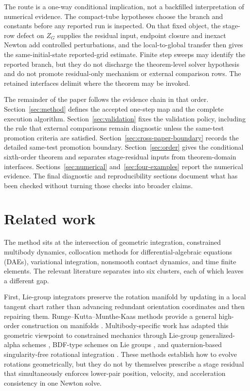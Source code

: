 \documentclass[preprint,12pt]{elsarticle}
\begin{document}
\noindent
The route is a one-way conditional implication, not a backfilled
interpretation of numerical evidence.  The compact-tube hypotheses choose the
branch and constants before any reported run is inspected.  On that fixed
object, the stage-row defect on \(Z_G\) supplies the residual input, endpoint
closure and inexact Newton add controlled perturbations, and the local-to-global
transfer then gives the same-initial-state reported-grid estimate.  Finite step
sweeps may identify the reported branch, but they do not discharge the
theorem-level solver hypothesis and do not promote residual-only mechanism or
external comparison rows.  The retained interfaces delimit where the theorem
may be invoked.

The remainder of the paper follows the evidence chain in that order.
Section~\ref{sec:method} defines the accepted one-step map and the complete
execution algorithm. Section~\ref{sec:validation} fixes the validation
policy, including the rule that external comparisons remain diagnostic unless
the same-test promotion criteria are satisfied.
Section~\ref{sec:cross-paper-boundary}
records the detailed same-test promotion boundary.
Section~\ref{sec:order} gives the conditional sixth-order theorem and separates
stage-residual inputs from theorem-domain interfaces. Sections~\ref{sec:numerical}
and~\ref{sec:four-examples} report the numerical evidence. The final
diagnostic and reproducibility sections document what has been checked without
turning those checks into broader claims.

\section{Related work}

The method sits at the intersection of geometric integration, constrained
multibody dynamics, collocation methods for differential-algebraic equations
(DAEs), variational integration, nonsmooth contact dynamics, and time finite
elements. The relevant literature separates into six clusters, each of which
leaves a different gap.

First, Lie-group integrators preserve the rotation manifold by updating in a
local tangent chart rather than advancing redundant orientation coordinates and
then repairing them. Runge--Kutta--Munthe-Kaas methods provide a general
high-order construction on manifolds \cite{munthe1998lie,munthe1999high}.
Multibody-specific work has adapted this geometric viewpoint to constrained
mechanics through Lie-group generalized-alpha schemes \cite{bruls2012lie},
BDF-type schemes on Lie groups \cite{wieloch2021bdf}, and quaternion-based
singularity-free rotational integration
\cite{terze2016singularity,terze2020aircraft}. These methods establish how to
evolve rotations geometrically, but they do not by themselves prescribe a
stage residual that simultaneously enforces lower-pair position, velocity, and
acceleration consistency in one Newton solve.
\end{document}
